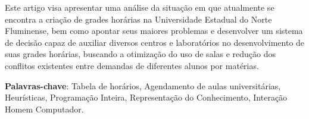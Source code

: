 \setlength{\absparsep}{18pt} %
\begin{resumo}

    Este artigo visa apresentar uma análise da situação em que atualmente se encontra a criação de grades horárias na Universidade Estadual do Norte Fluminense, bem como apontar seus maiores problemas e desenvolver um sistema de decisão capaz de auxiliar diversos centros e laboratórios no desenvolvimento de suas grades horárias, buscando a otimização do uso de salas e redução dos conflitos existentes entre demandas de diferentes alunos por matérias.
    
    \textbf{Palavras-chave}: Tabela de horários, Agendamento de aulas universitárias, Heurísticas, Programação Inteira, Representação do Conhecimento, Interação Homem Computador.

\end{resumo}
